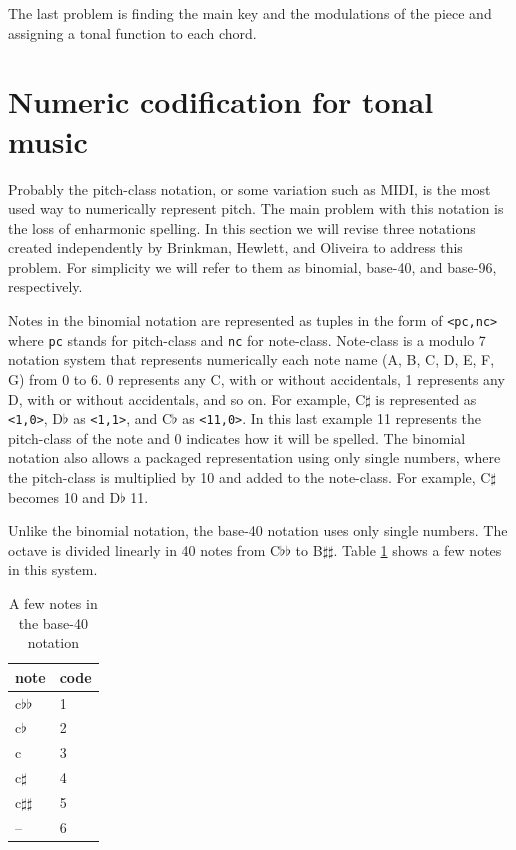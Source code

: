 \documentclass{article}
\begin{document}
The last problem is finding the main key and the modulations of the
piece and assigning a tonal function to each chord.

\section{Numeric codification for tonal music}
\label{sec:codificacao-jamary}

Probably the pitch-class notation, or some variation such as MIDI, is
the most used way to numerically represent pitch. The main problem
with this notation is the loss of enharmonic spelling. In this section
we will revise three notations created independently by Brinkman,
Hewlett, and Oliveira \cite{brinkman:binomial,
  hewlett:base-40, oliveira:busca} to address this problem.
For simplicity we will refer to them as binomial, base-40, and
base-96, respectively.

Notes in the binomial notation are represented as tuples in the form
of \texttt{<pc,nc>} where \texttt{pc} stands for pitch-class and
\texttt{nc} for note-class. Note-class is a modulo 7 notation system
that represents numerically each note name (A, B, C, D, E, F, G) from
0 to 6. 0 represents any C, with or without accidentals, 1 represents
any D, with or without accidentals, and so on. For example, C$\sharp$
is represented as \texttt{<1,0>}, D$\flat$ as \texttt{<1,1>}, and C$\flat$
as \texttt{<11,0>}. In this last example 11 represents the pitch-class of the
note and 0 indicates how it will be spelled. The binomial notation
also allows a packaged representation using only single numbers, where
the pitch-class is multiplied by 10 and added to the note-class. For
example, C$\sharp$ becomes 10 and D$\flat$ 11.

Unlike the binomial notation, the base-40 notation uses only single
numbers. The octave is divided linearly in 40 notes from C$\flat\flat$
to B$\sharp\sharp$. Table \ref{tab:base40} shows a few notes in this
system.

\begin{table}
  \centering
  \begin{tabular}{l|l}
    note & code \\
    \hline
    c$\flat\flat$ & 1 \\
    c$\flat$ & 2 \\
    c & 3 \\
    c$\sharp$ & 4 \\
    c$\sharp\sharp$ & 5 \\
    -- & 6 \\
  \end{tabular}
  \caption{A few notes in the base-40 notation}
  \label{tab:base40}
\end{table}
\end{document}
